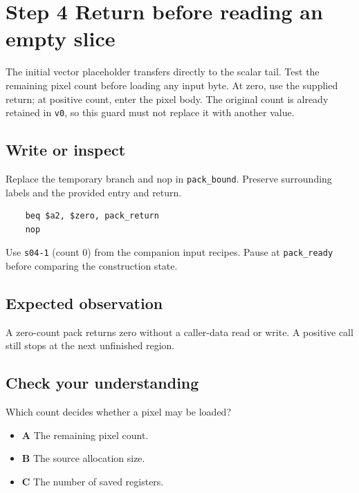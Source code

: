\section{Step 4 Return before reading an empty slice}\label{rgb-s04}

The initial vector placeholder transfers directly to the scalar tail. Test the remaining pixel count before loading any input byte. At zero, use the supplied return; at positive count, enter the pixel body. The original count is already retained in \texttt{v0}, so this guard must not replace it with another value.

\subsection{Write or inspect}
Replace the temporary branch and nop in \texttt{pack\_bound}. Preserve surrounding labels and the provided entry and return.

\begin{verbatim}
    beq $a2, $zero, pack_return
    nop
\end{verbatim}
Use \texttt{s04-1} (count 0) from the companion input recipes. Pause at \texttt{pack\_ready} before comparing the construction state.

\subsection{Expected observation}
A zero-count pack returns zero without a caller-data read or write. A positive call still stops at the next unfinished region.

\subsection{Check your understanding}
Which count decides whether a pixel may be loaded?

\begin{itemize}
  \item \textbf{A} The remaining pixel count.
  \item \textbf{B} The source allocation size.
  \item \textbf{C} The number of saved registers.
\end{itemize}
